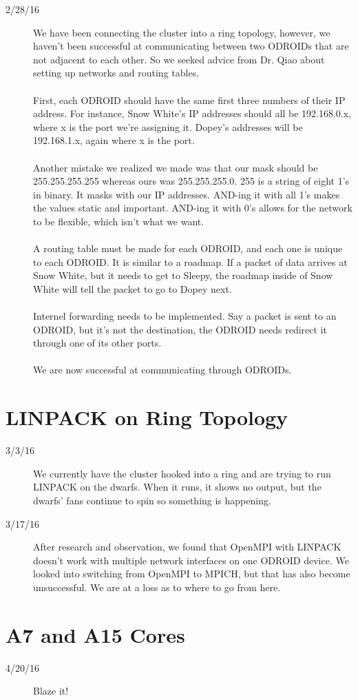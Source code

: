 \begin{description}
\item [2/28/16] We have been connecting the cluster into a ring topology, however, we haven't been successful at communicating between two ODROIDs that are not adjacent to each other. So we seeked advice from Dr. Qiao about setting up networks and routing tables. \\ \\
First, each ODROID should have the same first three numbers of their IP address. For instance, Snow White's IP addresses should all be 192.168.0.x, where x is the port we're assigning it. Dopey's addresses will be 192.168.1.x, again where x is the port. \\ \\
Another mistake we realized we made was that our mask should be 255.255.255.255 whereas ours was 255.255.255.0. 255 is a string of eight 1's in binary. It masks with our IP addresses. AND-ing it with all 1's makes the values static and important. AND-ing it with 0's allows for the network to be flexible, which isn't what we want. \\ \\
A routing table must be made for each ODROID, and each one is unique to each ODROID. It is similar to a roadmap. If a packet of data arrives at Snow White, but it needs to get to Sleepy, the roadmap inside of Snow White will tell the packet to go to Dopey next. \\ \\
Internel forwarding needs to be implemented. Say a packet is sent to an ODROID, but it's not the destination, the ODROID needs redirect it through one of its other ports. \\ \\
We are now successful at communicating through ODROIDs.
\end{description}

\section{LINPACK on Ring Topology}
\begin{description}
\item [3/3/16] We currently have the cluster hooked into a ring and are trying to run LINPACK on the dwarfs. When it runs, it shows no output, but the dwarfs' fans continue to spin so something is happening.
\item [3/17/16] After research and observation, we found that OpenMPI with LINPACK doesn't work with multiple network interfaces on one ODROID device. We looked into switching from OpenMPI to MPICH, but that has also become unsuccessful. We are at a loss as to where to go from here.
\end{description}

 \section{A7 and A15 Cores}
 \begin{description}
 \item [4/20/16] Blaze it!
 \end{description} 